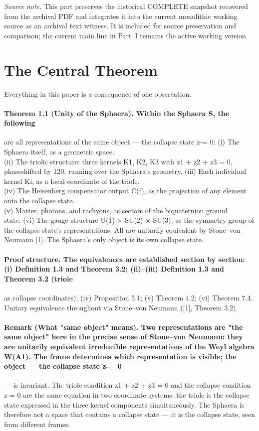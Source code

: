 \documentclass[12pt,a4paper]{article}
\begin{document}
\begin{center}
\textit{Source note.} This part preserves the historical COMPLETE snapshot recovered from the archival PDF and integrates it into the current monolithic working source as an archival text witness. It is included for source preservation and comparison; the current main line in Part~I remains the active working version.
\end{center}

\section{The Central Theorem}
Everything in this paper is a consequence of one observation.
\paragraph*{Theorem 1.1 (Unity of the Sphaera). Within the Sphaera S, the following}
are all representations of the same object --- the collapse state z-= 0:
(i) The Sphaera itself, as a geometric space.\\
(ii) The triolic structure: three kernels K1, K2, K3 with z1 + z2 + z3 = 0,\\
phaseshifted by 120, running over the Sphaera's geometry.
(iii) Each individual kernel Ki, as a local coordinate of the triole.\\
(iv) The Heisenberg compensator output C(f), as the projection of any element onto the collapse state.\\
(v) Matter, photons, and tachyons, as sectors of the biquaternion ground\\
state.
(vi) The gauge structure U(1) $\times$ SU(2) $\times$ SU(3), as the symmetry group of\\
the collapse state's representations. All are unitarily equivalent by Stone--von Neumann [1]. The Sphaera's only object is its own collapse state.
\paragraph*{Proof structure. The equivalences are established section by section: (i) Definition 1.3 and Theorem 3.2; (ii)--(iii) Definition 1.3 and Theorem 3.2 (triole}
as collapse coordinates); (iv) Proposition 5.1; (v) Theorem 4.2; (vi) Theorem 7.4. Unitary equivalence throughout via Stone--von Neumann ([1], Theorem 3.2).
\paragraph*{Remark (What "same object" means). Two representations are "the same object" here in the precise sense of Stone--von Neumann: they are unitarily equivalent irreducible representations of the Weyl algebra W(A1). The frame determines which representation is visible; the object --- the collapse state z-= 0}
--- is invariant. The triole condition z1 + z2 + z3 = 0 and the collapse condition z-= 0 are the same equation in two coordinate systems: the triole is the collapse state expressed in the three kernel components simultaneously. The Sphaera is therefore not a space that contains a collapse state --- it is the collapse state, seen from different frames.
\end{document}

